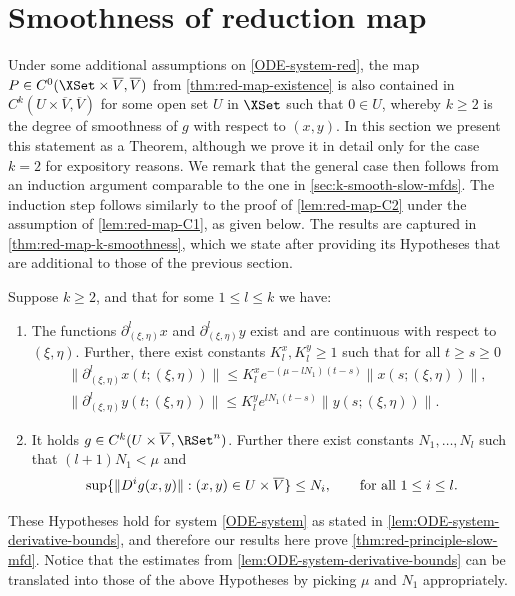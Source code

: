 \documentclass[a4paper]{siamart190516}
\begin{document}
 \section{Smoothness of reduction map}\label{sec:red-map-smoothness}

Under some additional assumptions on \cref{ODE-system-red}, the map $P \in C^0(\XSet \times \overline{V}, \overline{V})$
 from \cref{thm:red-map-existence} is also contained in $C^k(U \times \overline{V}, \overline{V})$
 for some open set $U$ in $\XSet$ such that $0 \in U$, whereby $k \geq 2$ is the degree of smoothness of $g$ with respect to $(x,y)$. 
 In this section we present this statement as a Theorem, although we prove it in detail only for the case $k=2$ for expository reasons.
 We remark that the general case then follows from an induction argument
 comparable to the one in \cref{sec:k-smooth-slow-mfds}. The induction step
 follows similarly to the proof of \cref{lem:red-map-C2} under the assumption of \cref{lem:red-map-C1}, 
 as given below. The results are captured in \cref{thm:red-map-k-smoothness}, 
 which we state after providing its Hypotheses that are additional to those of the previous section.
 
 \begin{hypothesis}\label{hyp:red-map-l-derivatives}
Suppose $k \geq 2$, and that for some $1 \leq l \leq k$ we have:
\begin{enumerate}
\item 
  The functions $\partial^l_{(\xi,\eta)} x$ and $\partial^l_{(\xi,\eta) }y$
  exist and are continuous with respect to $(\xi,\eta)$. Further, there exist
  constants $K^x_l, K^y_l \geq 1$ such that for all $t \geq s \geq 0$ 
  \[
    \begin{aligned}
  & \| \partial^l_{(\xi,\eta) }x(t;(\xi,\eta)) \| 
    \leq K^x_l e^{-(\mu - l N_1) (t-s)} \|x(s;(\xi,\eta))\|, \\
  & \| \partial^l_{(\xi,\eta) }y(t;(\xi,\eta)) \| \leq 
  K^y_l e^{l N_1 (t-s)} \|y(s;(\xi,\eta))\|.
    \end{aligned}
  \]
\item 
  It holds $g \in C^k(U \times \overline{V}, \RSet^n)$. Further there exist 
  constants $N_1, \ldots, N_l$ such that $(l+1)N_1 < \mu$ and
\[
  \sup \{\|D^i g(x,y)\| : (x,y) \in U \times \overline{V} \} \leq N_i, \qquad \text{for all $ 1 \leq i \leq l$.}
\]
\end{enumerate}
\end{hypothesis}

\begin{remark}
These Hypotheses hold for system \cref{ODE-system} as stated in \cref{lem:ODE-system-derivative-bounds}, and therefore our results here prove \cref{thm:red-principle-slow-mfd}. 
Notice that the estimates from \cref{lem:ODE-system-derivative-bounds} can be translated into those of the above Hypotheses by picking $\mu$ and $N_1$ appropriately. 
\end{remark}
 
\end{document}
